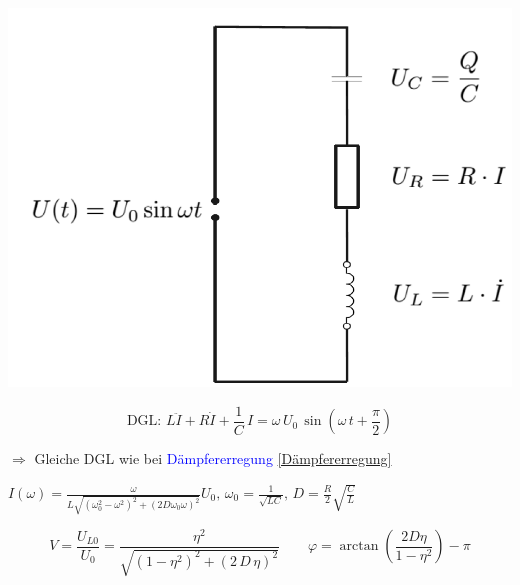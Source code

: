 \begin{minipage}{0.3\linewidth}
\includegraphics[width=\linewidth]{Bilder/Wellen-Optik/schwingkreis}  \\
\end{minipage}
\hfill
\begin{minipage}{0.68\linewidth}
$$ \boxed{ \text{DGL: } L \ddot{I} + R \dot{I} + \frac{1}{C} \, I = \omega \, U_0 \,\sin(\omega \, t + \frac{\pi}{2}) } $$

$\Rightarrow$ Gleiche DGL wie bei \textcolor{blue}{Dämpfererregung \ref{Dämpfererregung}} \\
\end{minipage}





$ \boxed{ I(\omega) =  \frac{\omega}{L\sqrt{(\omega_0^2 -\omega^2)^2 + (2D \omega_0 \omega)^2}}U_0, \, \omega_0 = \frac{1}{\sqrt{LC}} , \, D = \frac{R}{2}\sqrt{\frac{C}{L}}} $ 

\vspace{0.1cm}

$$ \boxed{ V = \frac{U_{L0}}{U_0} = \frac{\eta^2}{\sqrt{(1 - \eta^2)^2 + (2 \, D \, \eta)^2}} } \qquad \boxed{ \varphi = \arctan \left( \frac{2 D \eta}{1 - \eta^2} \right) - \pi } $$ 



